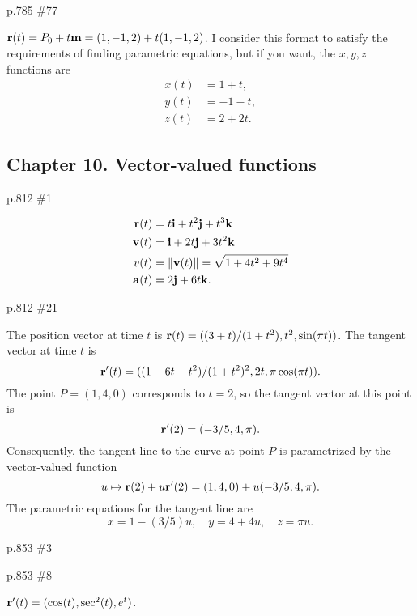 \documentclass[11pt,oneside]{amsart}
\theoremstyle{definition}
\begin{document}
\begin{practice}p.785 \#77\end{practice}
\begin{pracsol}
  $\mathbf r(t)=P_0+t\mathbf m=(1,-1,2)+t(1,-1,2)$. I consider this format to satisfy the requirements of finding parametric equations, but if you want, the $x,y,z$ functions are
  \begin{align*}
    x(t) &= 1+t,\\
    y(t) &= -1-t,\\
    z(t) &=2+2t.
  \end{align*}
\end{pracsol}

\subsection*{Chapter 10. Vector-valued functions}
\begin{practice}p.812 \#1\end{practice}
\begin{pracsol}
  \begin{align*}
    \mathbf r(t) &= t\mathbf i+t^2\mathbf j+t^3\mathbf k\\
    \mathbf v(t) &= \mathbf i+2t\mathbf j+3t^2\mathbf k\\
    v(t) &= \|\mathbf v(t)\| =\sqrt{1+4t^2+9t^4}\\
    \mathbf a(t) &= 2\mathbf j+6t\mathbf k.
  \end{align*}
\end{pracsol}
\begin{practice}p.812 \#21\end{practice}
\begin{pracsol}
  The position vector at time $t$ is $\mathbf r(t)=((3+t)/(1+t^2),t^2,\sin(\pi t))$. The tangent vector at time $t$ is
  \[\mathbf r'(t)=((1-6t-t^2)/(1+t^2)^2,2t,\pi\cos(\pi t)).\]
  The point $P=(1,4,0)$ corresponds to $t=2$, so the tangent vector at this point is
  \[\mathbf r'(2)=(-3/5,4,\pi).\]
  Consequently, the tangent line to the curve at point $P$ is parametrized by the vector-valued function
  \[u\mapsto \mathbf r(2)+u\mathbf r'(2)=(1,4,0)+u(-3/5,4,\pi).\]
  The parametric equations for the tangent line are
  \[x=1-(3/5)u,\quad y=4+4u,\quad z=\pi u.\]
\end{pracsol}
\begin{practice}p.853 \#3\end{practice}
\begin{pracsol}
  \begin{center}
  \end{center}
\end{pracsol}
\begin{practice}p.853 \#8\end{practice}
\begin{pracsol}
  $\mathbf r'(t)=(\cos(t),\sec^2(t),e^t)$.
\end{pracsol}
\end{document}
